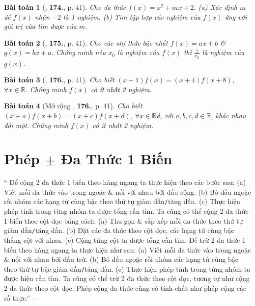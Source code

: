 \documentclass{article}
\numberwithin{equation}{section}
\newtheorem{baitoan}{Bài toán}
\begin{document}
\begin{baitoan}[\cite{Tuyen_Toan_7}, \textbf{174.}, p. 41]
	Cho đa thức $f(x) = x^2 + mx + 2$. (a) Xác định $m$ để $f(x)$ nhận $-2$ là 1 nghiệm. (b) Tìm tập hợp các nghiệm của $f(x)$ ứng với giá trị vừa tìm được của $m$.
\end{baitoan}

\begin{baitoan}[\cite{Tuyen_Toan_7}, \textbf{175.}, p. 41]
	Cho các nhị thức bậc nhất $f(x) = ax + b$ \& $g(x) = bx + a$. Chứng minh nếu $x_0$ là nghiệm của $f(x)$ thì $\frac{1}{x_0}$ là nghiệm của $g(x)$.
\end{baitoan}

\begin{baitoan}[\cite{Tuyen_Toan_7}, \textbf{176.}, p. 41]
	Cho biết $(x - 1)f(x) = (x + 4)f(x + 8)$, $\forall x\in\mathbb{R}$. Chứng minh $f(x)$ có ít nhất 2 nghiệm.
\end{baitoan}

\begin{baitoan}[Mở rộng \cite{Tuyen_Toan_7}, \textbf{176.}, p. 41]
	Cho biết $(x + a)f(x + b) = (x + c)f(x + d)$, $\forall x\in\mathbb{R}$d, với $a,b,c,d\in\mathbb{R}$, khác nhau đôi một. Chứng minh $f(x)$ có ít nhất 2 nghiệm.
\end{baitoan}


\section{Phép $\pm$ Đa Thức 1 Biến}
`` Để cộng 2 đa thức 1 biến theo hàng ngang ta thực hiện theo các bước sau: (a) Viết mỗi đa thức vào trong ngoặc \& nối với nhau bởi dấu cộng. (b) Bỏ dấu ngoặc rồi nhóm các hạng tử cùng bậc theo thứ tự giảm dần\texttt{/}tăng dần. (c) Thực hiện phép tính trong từng nhóm ta được tổng cần tìm. Ta cũng có thể cộng 2 đa thức 1 biến theo cột dọc bằng cách: (a) Thu gọn \& sắp xếp mỗi đa thức theo thứ tự giảm dần\texttt{/}tăng dần. (b) Đặt các đa thức theo cột dọc, các hạng tử cùng bậc thẳng cột với nhau. (c) Cộng từng cột ta được tổng cần tìm.  Để trừ 2 đa thức 1 biến theo hàng ngang ta thực hiện như sau: (a) Viết mỗi đa thức vào trong ngoặc \& nối với nhau bởi dấu trừ. (b) Bỏ dấu ngoặc rồi nhóm các hạng tử cùng bậc theo thứ tự bậc giảm dần\texttt{/}tăng dần. (c) Thực hiện phép tính trong từng nhóm ta được hiệu cần tìm. Ta cũng có thể trừ 2 đa thức theo cột dọc, tương tự như cộng 2 đa thức theo cột dọc.  Phép cộng đa thức cũng có tính chất như phép cộng các số thực.'' -- \cite[Chap. III, \S3, p. 42]{Tuyen_Toan_7}
\end{document}
